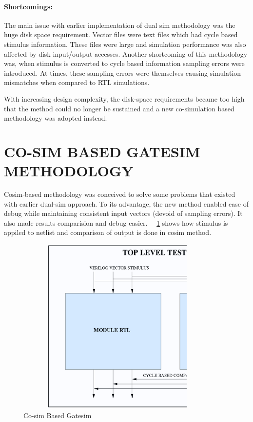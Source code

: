 \paragraph{Shortcomings:}The main issue with earlier implementation of dual sim methodology was the huge disk space requirement. Vector files were text files which had cycle based stimulus information. These files were large and simulation performance was also affected by disk input/output accesses. Another shortcoming of this methodology was, when stimulus is converted to cycle based information sampling errors were introduced. At times, these sampling errors were themselves causing simulation mismatches when compared to RTL simulations.

 
 With increasing design complexity, the disk-space requirements became too high that the method could no longer be sustained and a new co-simulation based methodology was adopted instead.





\section{CO-SIM BASED GATESIM METHODOLOGY}
 Cosim-based methodology was conceived to solve some problems that existed with earlier dual-sim approach. To its advantage, the new method enabled ease of debug while maintaining consistent input vectors (devoid of sampling errors). It also made results comparision and debug easier. ~\figurename{~\ref{fig:cosim.ps}} shows how stimulus is appiled to netlist and comparison of output is done in cosim method. %
 
\begin{figure}[h!]
\centering
\includegraphics[width=4in, height=3.5in]{./figures/cosim.ps}
\caption{Co-sim Based Gatesim}
\label{fig:cosim.ps}
\end{figure}


